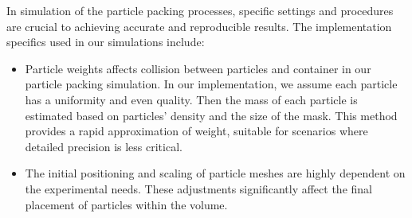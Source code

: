 \documentclass[preprint,12pt]{elsarticle}
\begin{document}
In simulation of the particle packing processes, specific settings and procedures are crucial to achieving accurate and reproducible results. 
The implementation specifics used in our simulations include:
\begin{itemize}
    \item
    Particle weights affects collision between particles and container in our particle packing simulation. 
    In our implementation, we assume each particle has a uniformity and even quality. 
    Then the mass of each particle is estimated based on particles' density and the size of the mask.
    This method provides a rapid approximation of weight, suitable for scenarios where detailed precision is less critical. 
    \item
    The initial positioning and scaling of particle meshes are highly dependent on the experimental needs. 
    These adjustments significantly affect the final placement of particles within the volume. 
\end{itemize}
\end{document}
